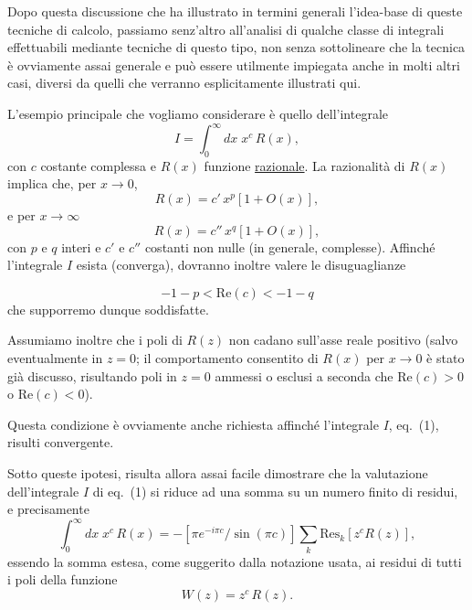 \documentclass[11pt, a4paper]{book}
\numberwithin{equation}{section}
\begin{document}
\medskip
Dopo questa discussione che ha illustrato in termini generali l'idea-base
di queste tecniche di calcolo, passiamo senz'altro all'analisi di qualche classe
di integrali effettuabili mediante tecniche di questo tipo, non senza sottolineare
che la tecnica è ovviamente assai generale e può essere utilmente impiegata anche
in molti altri casi, diversi da quelli che verranno esplicitamente illustrati qui.

L'esempio principale che vogliamo considerare è quello dell'integrale
\begin{equation}
    I = \int_0^\infty dx\; x^c\, R(x), \tag{1}
\end{equation}
con $c$ costante complessa e $R(x)$ funzione \underline{razionale}. La razionalità
di $R(x)$ implica che, per $x \to 0$,
\begin{equation}
    R(x) = c'\, x^p \left[1 + O(x)\right], \tag{2}
\end{equation}
e per $x \to \infty$
\begin{equation}
    R(x) = c''\, x^q \left[1 + O(x)\right], \tag{3}
\end{equation}
con $p$ e $q$ interi e $c'$ e $c''$ costanti non nulle (in generale, complesse).
Affinché l'integrale $I$ esista (converga), dovranno inoltre valere le disuguaglianze


\begin{equation}
    -1-p < \mathrm{Re}(c) < -1-q \tag{4}
\end{equation}
che supporremo dunque soddisfatte.

Assumiamo inoltre che i poli di $R(z)$ non cadano sull'asse reale positivo
(salvo eventualmente in $z=0$; il comportamento consentito di $R(x)$ per
$x \to 0$ è stato già discusso, risultando poli in $z=0$ ammessi o esclusi a
seconda che $\mathrm{Re}(c) > 0$ o $\mathrm{Re}(c) < 0$).

Questa condizione è ovviamente anche richiesta affinché l'integrale $I$,
eq.~(1), risulti convergente.

Sotto queste ipotesi, risulta allora assai facile dimostrare che la
valutazione dell'integrale $I$ di eq.~(1) si riduce ad una somma su un numero
finito di residui, e precisamente
\begin{equation}
    \int_0^\infty dx\; x^c\, R(x) = -\left[\pi e^{-i\pi c}/\sin(\pi c)\right]
    \sum_k \mathrm{Res}_k\!\left[z^c R(z)\right], \tag{5}
\end{equation}
essendo la somma estesa, come suggerito dalla notazione usata, ai residui di
tutti i poli della funzione
\begin{equation}
    W(z) = z^c\, R(z). \tag{6}
\end{equation}
\end{document}
